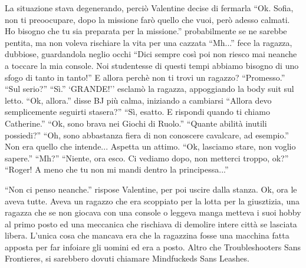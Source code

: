     La situazione stava degenerando, perciò Valentine decise di fermarla ``Ok. Sofia, non ti preoocupare, dopo la
    missione farò quello che vuoi, però adesso calmati. Ho bisogno che tu sia preparata per la missione.''
    probabilmente se ne sarebbe pentita, ma non voleva rischiare la vita per una cazzata ``Mh...'' fece la ragazza,
    dubbiose, guardandola neglio occhi ``Dici sempre così poi non riesco mai neanche a toccare la mia console. Noi
    studentesse di questi tempi abbiamo bisogno di uno sfogo di tanto in tanto!'' E allora perchè non ti trovi un
    ragazzo? ``Promesso.'' ``Sul serio?'' ``Sì.'' `GRANDE!'' esclamò la ragazza, appoggiando la body suit sul letto.
    ``Ok, allora.'' disse BJ più calma, iniziando a cambiarsi ``Allora devo semplicemente seguirti stasera?'' ``Sì,
    esatto. E rispondi quando ti chiamo Catherine.'' ``Ok, sono brava nei Giochi di Ruolo.'' ``Quante abilità inutili
    possiedi?'' ``Oh, sono abbastanza fiera di non conoscere cavalcare, ad esempio.'' Non era quello che intende...
    Aspetta un attimo. ``Ok, lasciamo stare, non voglio sapere.'' ``Mh?'' ``Niente, ora esco. Ci vediamo dopo, non
    metterci troppo, ok?'' ``Roger! A meno che tu non mi mandi dentro la principessa...''

    ``Non ci penso neanche.'' rispose Valentine, per poi uscire dalla stanza. Ok, ora le aveva tutte. Aveva un ragazzo
    che era scoppiato per la lotta per la giusztizia, una ragazza che se non giocava con una console o leggeva manga
    metteva i suoi hobby al primo posto ed una meccanica che rischiava di demolire intere città se lasciata libera.
    L'unica cosa che mancava era che la ragazzina fosse una macchina fatta apposta per far infoiare gli uomini ed era a
    posto. Altro che Troubleshooters Sans Frontieres, si sarebbero dovuti chiamare Mindfuckeds Sans Leashes.
